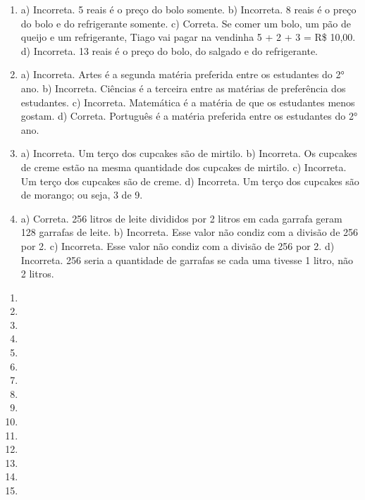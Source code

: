 \begin{enumerate}
\item
a) Incorreta. 5 reais é o preço do bolo somente.
b) Incorreta. 8 reais é o preço do bolo e do refrigerante somente.
c) Correta. Se comer um bolo, um pão de queijo e um refrigerante, Tiago
vai pagar na vendinha 5 + 2 + 3 = R\$ 10,00.
d) Incorreta. 13 reais é o preço do bolo, do salgado e do refrigerante.

\item
a) Incorreta. Artes é a segunda matéria preferida entre os estudantes do 2° ano.
b) Incorreta. Ciências é a terceira entre as matérias de preferência dos estudantes.
c) Incorreta. Matemática é a matéria de que os estudantes menos gostam.
d) Correta. Português é a matéria preferida entre os estudantes do 2° ano.

\item
a) Incorreta. Um terço dos cupcakes são de mirtilo.
b) Incorreta. Os cupcakes de creme estão na mesma quantidade dos cupcakes de mirtilo.
c) Incorreta. Um terço dos cupcakes são de creme.
d) Incorreta. Um terço dos cupcakes são de morango; ou seja, 3 de 9.

\item
a) Correta. 256 litros de leite divididos por 2 litros em cada garrafa geram 128 garrafas de leite.
b) Incorreta. Esse valor não condiz com a divisão de 256 por 2.
c) Incorreta. Esse valor não condiz com a divisão de 256 por 2.
d) Incorreta. 256 seria a quantidade de garrafas se cada uma tivesse 1 litro, não 2 litros.
\end{enumerate}


\begin{enumerate}
\item

\item

\item

\item

\item

\item

\item

\item

\item

\item

\item

\item

\item

\item

\item
\end{enumerate}